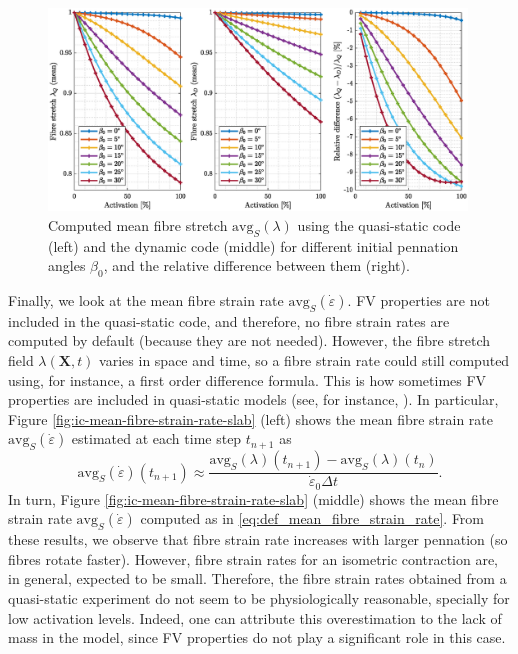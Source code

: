 \documentclass{sfuthesis}
\numberwithin{equation}{section}
\numberwithin{figure}{chapter}
\numberwithin{table}{chapter}
\theoremstyle{definition}
\def\*#1{{\mathbf{#1}}} %
\newcommand{\depsilon}{\dot{\varepsilon}}
\begin{document}
\begin{figure}
    \centering
    \includegraphics[width=0.99\textwidth]{ic-mean-fibre-stretch-slab.eps}
    \caption{Computed mean fibre stretch $\mathrm{avg}_S(\lambda)$ using the quasi-static code (left) and the dynamic code (middle) for different initial pennation angles $\beta_0$, and the relative difference between them (right).
    \label{fig:ic-mean-fibre-stretch-slab}}
\end{figure}

Finally, we look at the mean fibre strain rate $\mathrm{avg}_S(\depsilon)$. FV properties are not included in the quasi-static code, and therefore, no fibre strain rates are computed by default (because they are not needed). However, the fibre stretch field $\lambda(\*X,t)$ varies in space and time, so a fibre strain rate could still computed using, for instance, a first order difference formula. This is how sometimes FV properties are included in quasi-static models (see, for instance, \cite{DiSalvoBlemker2024}). In particular, Figure \ref{fig:ic-mean-fibre-strain-rate-slab} (left) shows the mean fibre strain rate $\mathrm{avg}_S(\depsilon)$ estimated at each time step $t_{n+1}$ as
\begin{equation}
    \mathrm{avg}_S(\depsilon)(t_{n+1}) \approx \dfrac{\mathrm{avg}_S(\lambda)(t_{n+1}) - \mathrm{avg}_S(\lambda)(t_{n})}{\depsilon_0 \Delta t}.
\end{equation}
In turn, Figure \ref{fig:ic-mean-fibre-strain-rate-slab} (middle) shows the mean fibre strain rate $\mathrm{avg}_S(\depsilon)$ computed as in \eqref{eq:def_mean_fibre_strain_rate}. From these results, we observe that fibre strain rate increases with larger pennation (so fibres rotate faster). However, fibre strain rates for an isometric contraction are, in general, expected to be small. Therefore, the fibre strain rates obtained from a quasi-static experiment do not seem to be physiologically reasonable, specially for low activation levels. Indeed, one can attribute this overestimation to the lack of mass in the model, since FV properties do not play a significant role in this case.
\end{document}
